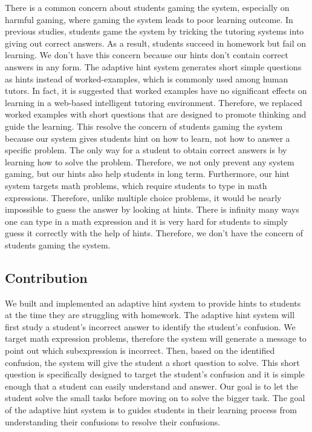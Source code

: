 \documentclass{llncs}
\begin{document}
There is a common concern about students gaming the system, especially on harmful gaming, where gaming the system leads to poor learning outcome\cite{Baker2004}\cite{Baker2005}. In previous studies, students game the system by tricking the tutoring systems into giving out correct answers\cite{Baker2004Off-task}. As a result, students succeed in homework but fail on learning. We don't have this concern because our hints don't contain correct answers in any form. The adaptive hint system generates short simple questions as hints instead of worked-examples, which is commonly used among human tutors\cite{Atkinson2000}. In fact, it is suggested that worked examples have no significant effects on learning in a web-based intelligent tutoring environment\cite{McLaren2006}. Therefore, we replaced worked examples with short questions that are designed to promote thinking and guide the learning. This resolve the concern of students gaming the system because our system gives students hint on how to learn, not how to answer a specific problem. The only way for a student to obtain correct answers is by learning how to solve the problem. Therefore, we not only prevent any system gaming, but our hints also help students in long term. Furthermore, our hint system targets math problems, which require students to type in math expressions. Therefore, unlike multiple choice problems, it would be nearly impossible to guess the answer by looking at hints. There is infinity many ways one can type in a math expression and it is very hard for students to simply guess it correctly with the help of hints. Therefore, we don't have the concern of students gaming the system.

\subsection*{Contribution}
We built and implemented an adaptive hint system to provide hints to students at the time they are struggling with homework. The adaptive hint system will first study a student's incorrect answer to identify the student's confusion. We target math expression problems, therefore the system will generate a message to point out which subexpression is incorrect. Then, based on the identified confusion, the system will give the student a short question to solve. This short question is specifically designed to target the student's confusion and it is simple enough that a student can easily understand and answer. Our goal is to let the student solve the small tasks before moving on to solve the bigger task. The goal of the adaptive hint system is to guides students in their learning process from understanding their confusions to resolve their confusions.
\end{document}
